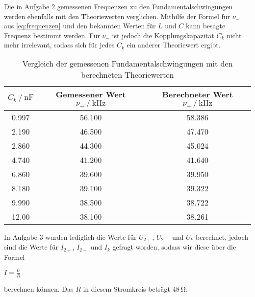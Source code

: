Die in Aufgabe 2 gemessenen Frequenzen zu den Fundamentalschwingungen werden ebenfalls mit den Theoriewerten verglichen. Mithilfe der Formel für $\nu _-$ aus \autoref{eq:frequenzen} und den bekannten Werten für $L$ und $C$ kann besagte Frequenz bestimmt werden. Für $\nu_-$ ist jedoch die Kopplungskapazität $C_k$ nicht mehr irrelevant, sodass sich für jedes $C_k$ ein anderer Theoriewert ergibt.

\begin{table}
  \centering
  \caption{Vergleich der gemessenen Fundamentalschwingungen mit den berechneten Theoriewerten}
  \label{tab:schwingung}
  \begin{tabular}{c c c}
    \toprule 
    $C_k \:/\: \si{\nano\farad}$ & Gemessener Wert $\nu _- \:/\: \si{\kilo\hertz}$ & Berechneter Wert $\nu _- \:/\: \si{\kilo\hertz}$    \\ 
    \midrule 
    0.997 & 56.100 & 58.386 \\
    2.190 & 46.500 & 47.470 \\
    2.860 & 44.300 & 45.024 \\
    4.740 & 41.200 & 41.640 \\
    6.860 & 39.600 & 39.950 \\
    8.180 & 39.100 & 39.322 \\
    9.990 & 38.500 & 38.722 \\
    12.00 & 38.100 & 38.261 \\
    \bottomrule
  \end{tabular}
\end{table}

In Aufgabe 3 wurden lediglich die Werte für $U_{2+}$, $U_{2-}$ und $U_k$ berechnet, jedoch sind die Werte für $I_{2+}$, $I_{2-}$ und $I_k$ gefragt worden, sodass wir diese über die Formel

$I = \frac{U}{R}$

berechnen können. Das $R$ in diesem Stromkreis beträgt $\SI{48}{\ohm}$. 





